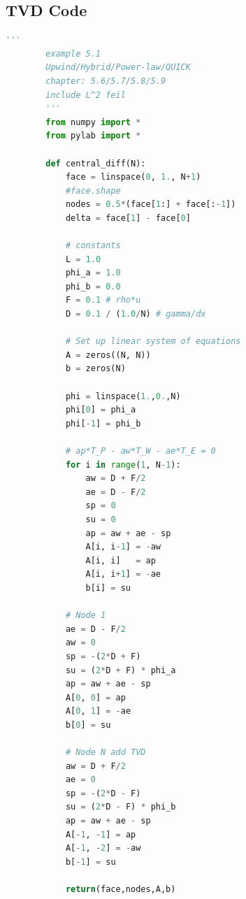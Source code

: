 \documentclass[paper=a4, fontsize=11pt]{article} %
\numberwithin{equation}{section} %
\numberwithin{figure}{section} %
\numberwithin{table}{section} %
\begin{document}
    \subsection{TVD Code}
    \lstset{frame=tb,
    language=Python,
    breaklines=true,
    showstringspaces=false,
    columns=flexible,
    numbers=none,
    tabsize=4
    }
    \begin{center}
        
        \begin{lstlisting}[language=Python, captionpos = b, caption=Source code for excercise 1]
        '''
        example 5.1
        Upwind/Hybrid/Power-law/QUICK
        chapter: 5.6/5.7/5.8/5.9
        include L^2 feil
        '''
        from numpy import *
        from pylab import *
        
        def central_diff(N):
            face = linspace(0, 1., N+1)
            #face.shape
            nodes = 0.5*(face[1:] + face[:-1])
            delta = face[1] - face[0]
        
            # constants
            L = 1.0
            phi_a = 1.0
            phi_b = 0.0
            F = 0.1 # rho*u
            D = 0.1 / (1.0/N) # gamma/dx
        
            # Set up linear system of equations
            A = zeros((N, N))
            b = zeros(N)
        
            phi = linspace(1.,0.,N) 
            phi[0] = phi_a
            phi[-1] = phi_b
            
            # ap*T_P - aw*T_W - ae*T_E = 0
            for i in range(1, N-1):
                aw = D + F/2
                ae = D - F/2
                sp = 0
                su = 0
                ap = aw + ae - sp
                A[i, i-1] = -aw
                A[i, i]   = ap
                A[i, i+1] = -ae
                b[i] = su
        
            # Node 1
            ae = D - F/2
            aw = 0
            sp = -(2*D + F)
            su = (2*D + F) * phi_a
            ap = aw + ae - sp
            A[0, 0] = ap
            A[0, 1] = -ae
            b[0] = su
        
            # Node N add TVD
            aw = D + F/2
            ae = 0
            sp = -(2*D - F)
            su = (2*D - F) * phi_b
            ap = aw + ae - sp
            A[-1, -1] = ap
            A[-1, -2] = -aw
            b[-1] = su
        
            return(face,nodes,A,b)
                

\end{lstlisting}
\end{center}
\end{document}
